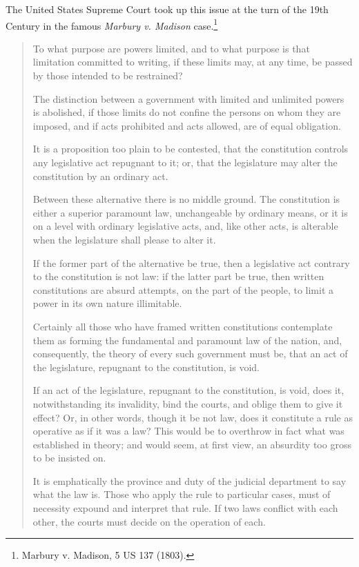 The United States Supreme Court took up this issue at the turn of the 19th Century in the famous \textit{Marbury v. Madison} case.\footnote{Marbury v. Madison, 5 US 137 (1803).}

\begin{quote}

To what purpose are powers limited, and to what purpose is that limitation committed to writing, if these limits may, at any time, be passed by those intended to be restrained? 

The distinction between a government with limited and unlimited powers is abolished, if those limits do not confine the persons on whom they are imposed, and if acts prohibited and acts allowed, are of equal obligation. 

It is a proposition too plain to be contested, that the constitution controls any legislative act repugnant to it; or, that the legislature may alter the constitution by an ordinary act.

Between these alternative there is no middle ground. The constitution is either a superior paramount law, unchangeable by ordinary means, or it is on a level with ordinary legislative acts, and, like other acts, is alterable when the legislature shall please to alter it.

If the former part of the alternative be true, then a legislative act contrary to the constitution is not law: if the latter part be true, then written constitutions are absurd attempts, on the part of the people, to limit a power in its own nature illimitable.

Certainly all those who have framed written constitutions contemplate them as forming the fundamental and paramount law of the nation, and, consequently, the theory of every such government must be, that an act of the legislature, repugnant to the constitution, is void.

If an act of the legislature, repugnant to the constitution, is void, does it, notwithstanding its invalidity, bind the courts, and oblige them to give it effect? Or, in other words, though it be not law, does it constitute a rule as operative as if it was a law? This would be to overthrow in fact what was established in theory; and would seem, at first view, an absurdity too gross to be insisted on.

It is emphatically the province and duty of the judicial department to say what the law is. Those who apply the rule to particular cases, must of necessity expound and interpret that rule. If two laws conflict with each other, the courts must decide on the operation of each.


\end{quote}

